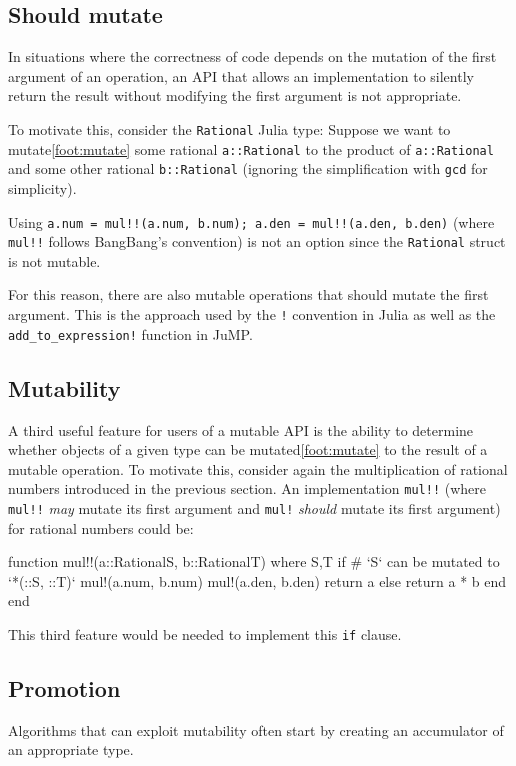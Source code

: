 \documentclass{juliacon}
\begin{document}
\subsection{Should mutate}
In situations where the correctness of code depends on
the mutation of the first argument of an operation,
an API that allows an implementation to silently return the
result without modifying the first argument is not appropriate.

To motivate this, consider the \lstinline|Rational| Julia type:
Suppose we want to mutate\cref{foot:mutate} some rational \lstinline|a::Rational| to the
product of \lstinline|a::Rational| and some other rational \lstinline|b::Rational|
(ignoring the simplification with \lstinline|gcd| for simplicity).

Using \lstinline|a.num = mul!!(a.num, b.num); a.den = mul!!(a.den, b.den)|
(where \lstinline|mul!!| follows BangBang's convention)
is not an option since
the \lstinline|Rational| struct is not mutable.

For this reason, there are also mutable operations that should mutate the first argument.
This is the approach used by the \lstinline|!| convention in Julia
as well as the \lstinline|add_to_expression!| function in JuMP.

\subsection{Mutability}
A third useful feature for users of a mutable API is the ability to
determine whether objects of a given type can be mutated\cref{foot:mutate} to the result of a mutable operation.
To motivate this, consider again the multiplication of rational numbers introduced in the previous section.
An implementation \lstinline|mul!!| (where \lstinline|mul!!| \emph{may} mutate its first argument and \lstinline|mul!| \emph{should} mutate its first argument)
for rational numbers could be:
\begin{jllisting}
function mul!!(a::Rational{S}, b::Rational{T}) where {S,T}
    if # `S` can be mutated to `*(::S, ::T)`
        mul!(a.num, b.num)
        mul!(a.den, b.den)
        return a
    else
        return a * b
    end
end
\end{jllisting}
This third feature would be needed to implement this \lstinline|if| clause.

\subsection{Promotion}
Algorithms that can exploit mutability often start by creating an accumulator of
an appropriate type.
\end{document}
